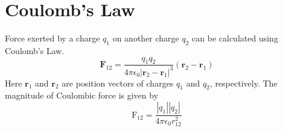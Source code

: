 \documentclass[12pt,a4paper]{article}
\begin{document}
\section{Coulomb's Law}
Force exerted by a charge $q_1$ on another charge $q_2$ can be calculated using Coulomb's Law.
\begin{equation}
\textbf{F}_{12}=\dfrac{q_1q_2}{4\pi\epsilon_0 |\textbf{r}_2-\textbf{r}_1|^3}(\textbf{r}_2-\textbf{r}_1)
\end{equation}
Here $\textbf{r}_1$ and $\textbf{r}_2$ are position vectors of charges $q_1$ and $q_2$, respectively. The magnitude of Coulombic force is given by
\begin{equation}
\mathrm{F}_{12}=\dfrac{|q_1||q_2|}{4\pi\epsilon_0r_{12}^2}
\end{equation}
%
%
\end{document}

